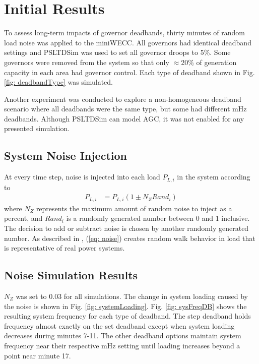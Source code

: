 \section{Initial Results}
To assess long-term impacts of governor deadbands, thirty minutes of random load noise was applied to the miniWECC.
All governors had identical deadband settings and
PSLTDSim was used to set all governor droops to 5\%.
Some governors were removed from the system so that only $\approx$20\% of generation capacity in each area had governor control.
Each type of deadband shown in Fig. \ref{fig: deadbandType} was simulated.

Another experiment was conducted to explore a non-homogeneous deadband scenario where all deadbands were the same type, but some had different mHz deadbands.
Although PSLTDSim can model AGC, it was not enabled for any presented simulation.



\subsection{System Noise Injection}
At every time step, noise is injected into each load $P_{L,i}$ in the system according to
\begin{align}
P_{L,i} &= P_{L,i}(1 \pm N_Z Rand_i) \label{eq: noise}
\end{align}
where $N_Z$ represents the maximum amount of random noise to inject as a percent,
and $Rand_i$ is a randomly generated number between 0 and 1 inclusive.
The decision to add or subtract noise is chosen by another randomly generated number.
As described in \cite{AGCCresap}, (\ref{eq: noise}) creates random walk behavior in load that is representative of real power systems.


\subsection{Noise Simulation Results}

$N_Z$ was set to 0.03 for all simulations. 
The change in system loading caused by the noise is shown in Fig. \ref{fig: systemLoading}.
Fig. \ref{fig: sysFreqDB} shows the resulting system frequency for each type of deadband.
The step deadband holds frequency almost exactly on the set deadband except when system loading decreases during minutes 7-11.
The other deadband options maintain system frequency near their respective mHz setting until loading increases beyond a point near minute 17.



